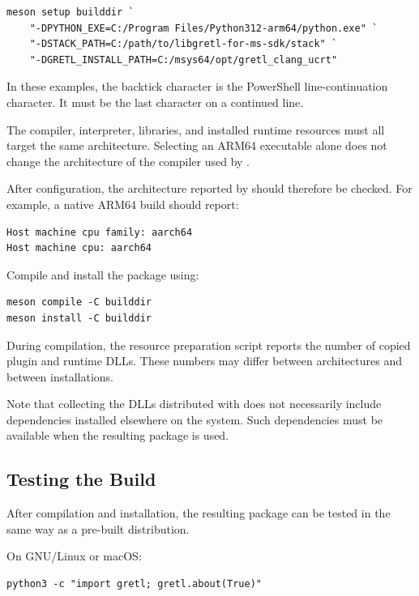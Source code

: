 \begin{verbatim}
meson setup builddir `
	"-DPYTHON_EXE=C:/Program Files/Python312-arm64/python.exe" `
	"-DSTACK_PATH=C:/path/to/libgretl-for-ms-sdk/stack" `
	"-DGRETL_INSTALL_PATH=C:/msys64/opt/gretl_clang_ucrt"
\end{verbatim}

In these examples, the backtick character is the
PowerShell line-continuation character. It must be
the last character on a continued line.

The compiler, \python interpreter, \lgretl libraries,
and installed \gretl runtime resources must all target
the same architecture. Selecting an ARM64 \python
executable alone does not change the architecture
of the compiler used by .

After configuration, the architecture reported by
 should therefore be checked. For example,
a native ARM64 build should report:

\begin{verbatim}
Host machine cpu family: aarch64
Host machine cpu: aarch64
\end{verbatim}

Compile and install the package using:

\begin{verbatim}
meson compile -C builddir
meson install -C builddir
\end{verbatim}

During compilation, the resource preparation script
reports the number of copied plugin and runtime DLLs.
These numbers may differ between architectures and
between \gretl installations.

Note that collecting the DLLs distributed with
\gretl does not necessarily include dependencies
installed elsewhere on the system. Such dependencies
must be available when the resulting package is used.



\subsection{Testing the Build}
After compilation and installation, the resulting
\gretlpy package can be tested in the same way
as a pre-built distribution.

On GNU/Linux or macOS:

\begin{verbatim}
python3 -c "import gretl; gretl.about(True)"
\end{verbatim}


